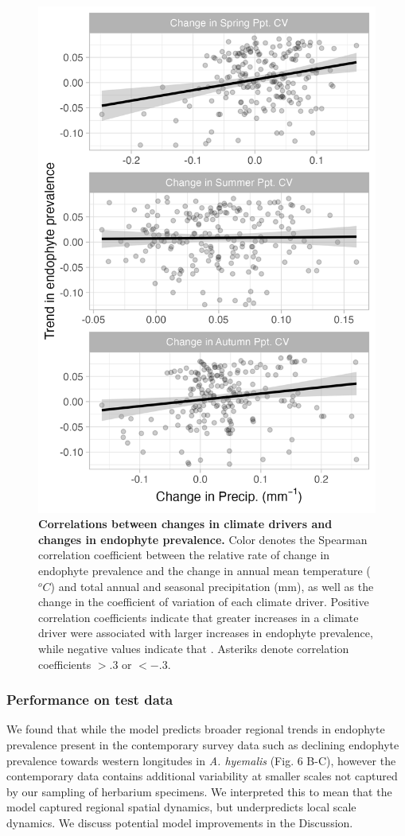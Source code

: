 \documentclass[11pt]{article}
\begin{document}
\begin{figure}[H]
	\centering
	\includegraphics[width = .7\linewidth]{ppt_CV_regression_plot_ESA.png}
	\caption{\textbf{Correlations between changes in climate drivers and changes in endophyte prevalence.} Color denotes the Spearman correlation coefficient between the relative rate of change in endophyte prevalence and the change in annual mean temperature ($^oC$) and total annual and seasonal precipitation (mm), as well as the change in the coefficient of variation of each climate driver. Positive correlation coefficients indicate that greater increases in a climate driver were associated with larger increases in endophyte prevalence, while negative values indicate that . Asteriks denote correlation coefficients $> .3$ or $< -.3$.}
\end{figure}



\subsubsection*{Performance on test data}
We found that while the model predicts broader regional trends in endophyte prevalence present in the contemporary survey data such as declining endophyte prevalence towards western longitudes in \emph{A. hyemalis} (Fig. 6 B-C), however the contemporary data contains additional variability at smaller scales not captured by our sampling of herbarium specimens.
We interpreted this to mean that the model captured regional spatial dynamics, but underpredicts local scale dynamics. 
We discuss potential model improvements in the Discussion.
\end{document}
